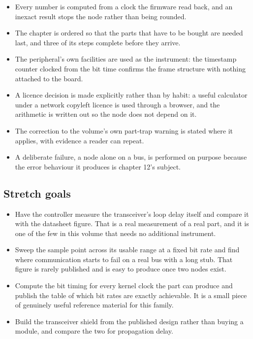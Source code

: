 \begin{itemize}
\item Every number is computed from a clock the firmware read back, and an
inexact result stops the node rather than being rounded.
\item The chapter is ordered so that the parts that have to be bought are needed
last, and three of its steps complete before they arrive.
\item The peripheral's own facilities are used as the instrument: the timestamp
counter clocked from the bit time confirms the frame structure with nothing
attached to the board.
\item A licence decision is made explicitly rather than by habit: a useful
calculator under a network copyleft licence is used through a browser, and the
arithmetic is written out so the node does not depend on it.
\item The correction to the volume's own part-trap warning is stated where it
applies, with evidence a reader can repeat.
\item A deliberate failure, a node alone on a bus, is performed on purpose
because the error behaviour it produces is chapter 12's subject.
\end{itemize}

\subsection*{Stretch goals}

\begin{itemize}
\item Have the controller measure the transceiver's loop delay itself and
compare it with the datasheet figure. That is a real measurement of a real part,
and it is one of the few in this volume that needs no additional instrument.
\item Sweep the sample point across its usable range at a fixed bit rate and
find where communication starts to fail on a real bus with a long stub. That
figure is rarely published and is easy to produce once two nodes exist.
\item Compute the bit timing for every kernel clock the part can produce and
publish the table of which bit rates are exactly achievable. It is a small
piece of genuinely useful reference material for this family.
\item Build the transceiver shield from the published design rather than buying
a module, and compare the two for propagation delay.
\end{itemize}

